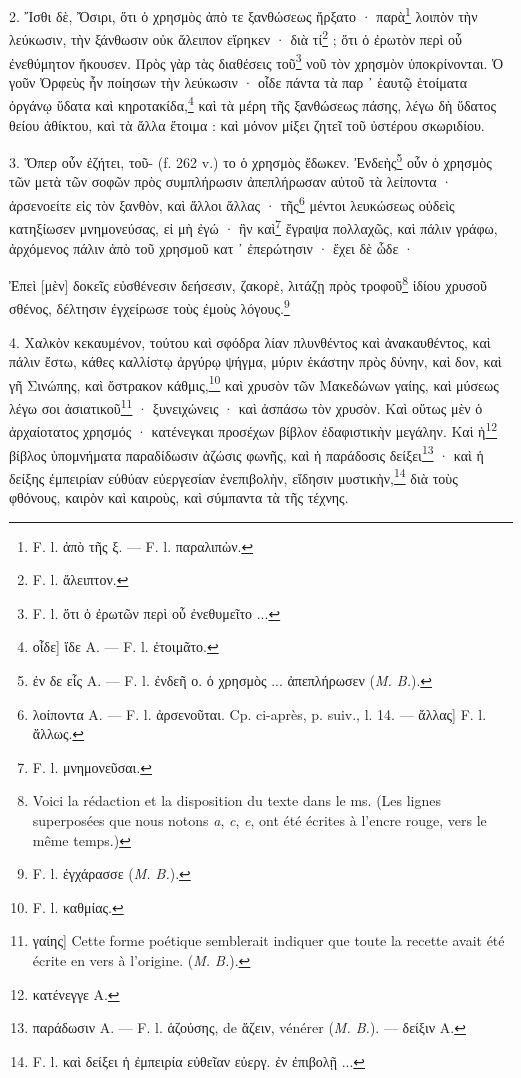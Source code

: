 \documentclass[a4paper, 11pt, oneside, polutonikogreek, french]{article}
\begin{document}
2. Ἴσθι δὲ, Ὄσιρι, ὅτι ὁ χρησμὸς ἀπὸ τε ξανθώσεως ἤρξατο · παρὰ\footnote{F. l. ἀπὸ τῆς ξ. --- F. l. παραλιπὼν.} λοιπὸν τὴν λεύκωσιν, τὴν ξάνθωσιν οὐκ ἄλειπον εἴρηκεν · διὰ τί\footnote{F. l. ἄλειπτον.} ; ὅτι ὁ ἐρωτὸν περὶ οὗ ἐνεθύμητον ἤκουσεν. Πρὸς γὰρ τὰς διαθέσεις τοῦ\footnote{F. l. ὅτι ὁ ἐρωτῶν περὶ οὗ ἐνεθυμεῖτο ...} νοῦ τὸν χρησμὸν ὑποκρίνονται. Ὁ γοῦν Ὀρφεὺς ἦν ποίησων τὴν λεύκωσιν · οἶδε πάντα τὰ παρ ᾽ ἑαυτῷ ἑτοίματα ὀργάνῳ ὕδατα καὶ κηροτακίδα,\footnote{οἶδε] ἴδε A. --- F. l. ἐτοιμᾶτο.} καὶ τὰ μέρη τῆς ξανθώσεως πάσης, λέγω δὴ ὕδατος θείου ἀθίκτου, καὶ τὰ ἄλλα ἔτοιμα : καὶ μόνον μίξει ζητεῖ τοῦ ὐστέρου σκωριδίου.

3. Ὅπερ οὖν ἐζήτει, τοῦ- (f. 262 v.) το ὁ χρησμὸς ἔδωκεν. Ἐνδεὴς\footnote{ἐν δε εἷς A. --- F. l. ἐνδεῆ ο. ὁ χρησμὸς ... ἀπεπλήρωσεν (\emph{M. B.}).} οὖν ὁ χρησμὸς τῶν μετὰ τῶν σοφῶν πρὸς συμπλήρωσιν ἀπεπλήρωσαν αὐτοῦ τὰ λείποντα · ἀρσενοείτε εἰς τὸν ξανθὸν, καὶ ἄλλοι ἄλλας · τῆς\footnote{λοίποντα A. --- F. l. ἀρσενοῦται. Cp. ci-après, p. suiv.,  l. 14. --- ἄλλας] F. l. ἄλλως.} μέντοι λευκώσεως οὐδεὶς κατηξίωσεν μνημονεύσας, εἰ μὴ ἐγώ · ἣν καὶ\footnote{F. l. μνημονεῦσαι.} ἔγραψα πολλαχῶς, καὶ πάλιν γράφω, ἀρχόμενος πάλιν ἀπὸ τοῦ χρησμοῦ κατ ᾽ ἐπερώτησιν · ἔχει δὲ ὧδε ·

Ἐπεὶ [μὲν] δοκεῖς εὐσθένεσιν δεήσεσιν, ζακορὲ, λιτάζῃ πρὸς τροφοῦ\footnote{Voici la rédaction et la disposition du texte dans le ms. (Les lignes superposées que nous notons \emph{a}, \emph{c}, \emph{e}, ont été écrites à l'encre rouge, vers le même temps.)  } ἰδίου χρυσοῦ σθένος, δέλτησιν ἐγχείρωσε τοὺς ἐμοὺς λόγους.\footnote{F. l. ἐγχάρασσε (\emph{M. B.}).}

4. Χαλκὸν κεκαυμένον, τούτου καὶ σφόδρα λίαν πλυνθέντος καὶ ἀνακαυθέντος, καὶ πάλιν ἔστω, κάθες καλλίστῳ ἀργύρῳ ψήγμα, μύριν ἑκάστην πρὸς δύνην, καὶ δον, καὶ γῆ Σινώπης, καὶ ὄστρακον κάθμις,\footnote{F. l. καθμίας.} καὶ χρυσὸν τῶν Μακεδώνων γαίης, καὶ μύσεως λέγω σοι ἀσιατικοῦ\footnote{γαίης] Cette forme poétique semblerait indiquer que toute la recette avait été écrite en vers à l'origine. (\emph{M. B.}).} · ξυνειχώνεις · καὶ ἀσπάσω τὸν χρυσὸν. Καὶ οὕτως μὲν ὁ ἀρχαίοτατος χρησμός · κατένεγκαι προσέχων βίβλον ἐδαφιστικὴν μεγάλην. Καὶ ἡ\footnote{κατένεγγε A.} βίβλος ὑπομνήματα παραδίδωσιν ἀζώσις φωνῆς, καὶ ἡ παράδοσις δείξει\footnote{παράδωσιν A. --- F. l. ἁζούσης, de ἅζειν, vénérer (\emph{M. B.}). --- δείξιν A.} · καὶ ἡ δείξης ἐμπειρίαν εὐθύαν εὐεργεσίαν ἐνεπιβολὴν, εἴδησιν μυστικὴν,\footnote{F. l. καὶ δείξει ἡ ἐμπειρία εὐθεῖαν εὐεργ. ἐν ἐπιβολῇ ...} διὰ τοὺς φθόνους, καιρὸν καὶ καιροὺς, καὶ σύμπαντα τὰ τῆς τέχνης.
\end{document}
